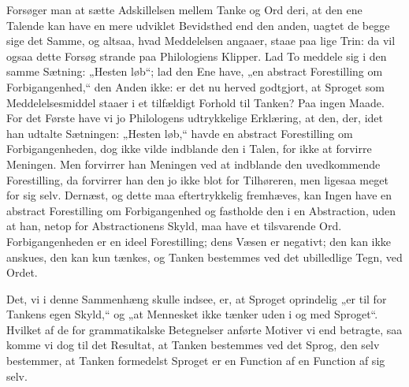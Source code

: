 \documentclass[12pt]{book}
\newcommand{\opage}[1]{\marginnote{\footnotesize\textit{[#1]}}}
\begin{document}
Forsøger man at sætte Adskillelsen mellem Tanke og
Ord deri, at den ene Talende kan have en mere udviklet
Bevidsthed end den anden, uagtet de begge sige det Samme,
\opage{40}og altsaa, hvad Meddelelsen angaaer, staae paa lige Trin: da
vil ogsaa dette Forsøg strande paa Philologiens Klipper. Lad
To meddele sig i den samme Sætning: „Hesten løb“; lad den Ene
have, „en abstract Forestilling om Forbigangenhed,“ den Anden
ikke: er det nu herved godtgjort, at Sproget som Meddelelsesmiddel
staaer i et tilfældigt Forhold til Tanken? Paa ingen
Maade. For det Første have vi jo Philologens udtrykkelige
Erklæring, at den, der, idet han udtalte Sætningen: „Hesten
løb,“ havde en abstract Forestilling om Forbigangenheden, dog
ikke vilde indblande den i Talen, for ikke at forvirre Meningen.
Men forvirrer han Meningen ved at indblande den uvedkommende
Forestilling, da forvirrer han den jo ikke blot for
Tilhøreren, men ligesaa meget for sig selv. Dernæst, og dette
maa eftertrykkelig fremhæves, kan Ingen have en abstract
Forestilling om Forbigangenhed og fastholde den i en Abstraction,
uden at han, netop for Abstractionens Skyld, maa have
et tilsvarende Ord. Forbigangenheden er en ideel Forestilling;
dens Væsen er negativt; den kan ikke anskues, den kan kun
tænkes, og Tanken bestemmes ved det ubilledlige Tegn, ved
Ordet.

Det, vi i denne Sammenhæng skulle indsee, er, at Sproget
oprindelig „er til for Tankens egen Skyld,“ og „at Mennesket
ikke tænker uden i og med Sproget“. Hvilket af de for
grammatikalske Betegnelser anførte Motiver vi end betragte, saa
komme vi dog til det Resultat, at Tanken bestemmes ved
det Sprog, den selv bestemmer, at Tanken formedelst Sproget
er en Function af en Function af sig selv.
\end{document}
